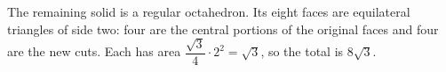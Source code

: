 The remaining solid is a regular octahedron. Its eight faces are equilateral triangles of side two: four are the central portions of the original faces and four are the new cuts. Each has area $\dfrac{\sqrt3}{4}\cdot2^2=\sqrt3$, so the total is $\boxed{8\sqrt3}$.
